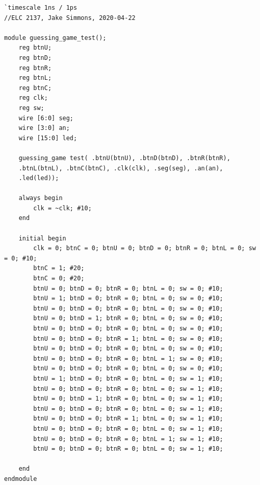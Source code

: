 \documentclass[11pt]{article}
\begin{document}
\begin{lstlisting}[style=Verilog,
caption=guessing game Test Bench,
label=guessing game Test
]
`timescale 1ns / 1ps
//ELC 2137, Jake Simmons, 2020-04-22

module guessing_game_test();
	reg btnU;
	reg btnD;
	reg btnR;
	reg btnL;
	reg btnC;
	reg clk;
	reg sw;
	wire [6:0] seg;
	wire [3:0] an;
	wire [15:0] led; 

	guessing_game test( .btnU(btnU), .btnD(btnD), .btnR(btnR),
	.btnL(btnL), .btnC(btnC), .clk(clk), .seg(seg), .an(an), 
	.led(led));

	always begin
		clk = ~clk; #10;
	end

	initial begin
		clk = 0; btnC = 0; btnU = 0; btnD = 0; btnR = 0; btnL = 0; sw = 0; #10;
		btnC = 1; #20;
		btnC = 0; #20;
		btnU = 0; btnD = 0; btnR = 0; btnL = 0; sw = 0; #10;
		btnU = 1; btnD = 0; btnR = 0; btnL = 0; sw = 0; #10;
		btnU = 0; btnD = 0; btnR = 0; btnL = 0; sw = 0; #10;
		btnU = 0; btnD = 1; btnR = 0; btnL = 0; sw = 0; #10;
		btnU = 0; btnD = 0; btnR = 0; btnL = 0; sw = 0; #10;
		btnU = 0; btnD = 0; btnR = 1; btnL = 0; sw = 0; #10;
		btnU = 0; btnD = 0; btnR = 0; btnL = 0; sw = 0; #10;
		btnU = 0; btnD = 0; btnR = 0; btnL = 1; sw = 0; #10;
		btnU = 0; btnD = 0; btnR = 0; btnL = 0; sw = 0; #10;
		btnU = 1; btnD = 0; btnR = 0; btnL = 0; sw = 1; #10;
		btnU = 0; btnD = 0; btnR = 0; btnL = 0; sw = 1; #10;
		btnU = 0; btnD = 1; btnR = 0; btnL = 0; sw = 1; #10;
		btnU = 0; btnD = 0; btnR = 0; btnL = 0; sw = 1; #10;
		btnU = 0; btnD = 0; btnR = 1; btnL = 0; sw = 1; #10;
		btnU = 0; btnD = 0; btnR = 0; btnL = 0; sw = 1; #10;
		btnU = 0; btnD = 0; btnR = 0; btnL = 1; sw = 1; #10;
		btnU = 0; btnD = 0; btnR = 0; btnL = 0; sw = 1; #10;

	end
endmodule

\end{lstlisting}
\end{document}
